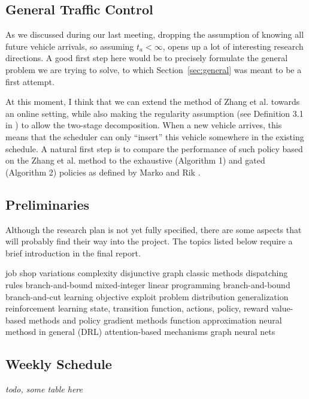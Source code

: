 \documentclass{article}
\theoremstyle{definition}
\theoremstyle{plain}
\begin{document}
\subsection{General Traffic Control}

As we discussed during our last meeting, dropping the assumption of knowing all
future vehicle arrivals, so assuming $t_{a} < \infty$, opens up a lot of
interesting research directions. A good first step here would be to precisely
formulate the general problem we are trying to solve, to which
Section~\ref{sec:general} was meant to be a first attempt.

At this moment, I think that we can extend the method of Zhang et al. towards an
online setting, while also making the regularity assumption (see Definition 3.1
in \cite{timmermanPlatoonFormingAlgorithms2021}) to allow the two-stage
decomposition. When a new vehicle arrives, this means that the scheduler can
only ``insert'' this vehicle somewhere in the existing schedule. A natural first
step is to compare the performance of such policy based on the Zhang et al.
method to the exhaustive (Algorithm 1) and gated (Algorithm 2) policies as
defined by Marko and Rik \cite{timmermanPlatoonFormingAlgorithms2021}.

\subsection{Preliminaries}

Although the research plan is not yet fully specified, there are some aspects that will probably find their way into the project. The topics listed below require a brief introduction in the final report.
\begin{outline}
\1 job shop
    \2 variations
    \2 complexity
    \2 disjunctive graph
    \2 classic methods
        \3 dispatching rules
        \3 branch-and-bound
\1 mixed-integer linear programming
    \2 branch-and-bound
    \2 branch-and-cut
\1 learning objective \cite{bengioMachineLearningCombinatorial2020}
    \2 exploit problem distribution
    \2 generalization
\1 reinforcement learning
    \2 state, transition function, actions, policy, reward
    \2 value-based methods and policy gradient methods
    \2 function approximation
        \3 neural methosd in general (DRL)
        \3 attention-based mechanisms
        \3 graph neural nets
\end{outline}


\subsection{Weekly Schedule}

\textit{todo, some table here}



\end{document}
